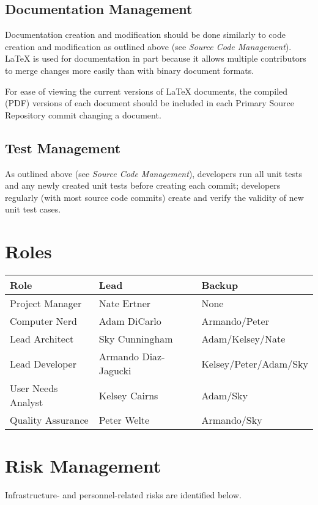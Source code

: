 \documentclass[11pt]{article}
\begin{document}
	\subsection{Documentation Management}
		Documentation creation and modification should be done similarly to code creation and modification as outlined above (see {\em Source Code Management}). LaTeX is used for documentation in part because it allows multiple contributors to merge changes more easily than with binary document formats.

		For ease of viewing the current versions of LaTeX documents, the compiled (PDF) versions of each document should be included in each Primary Source Repository commit changing a document.

	\subsection{Test Management}
		As outlined above (see {\em Source Code Management}), developers run all unit tests and any newly created unit tests before creating each commit; developers regularly (with most source code commits) create and verify the validity of new unit test cases.

\section{Roles}
\begin{tabular}{|l|l|l|}
\hline
\textbf{Role} & \textbf{Lead} & \textbf{Backup}  \\ \hline
Project Manager & Nate Ertner & None\\ \hline
Computer Nerd & Adam DiCarlo  & Armando/Peter\\ \hline
Lead Architect & Sky Cunningham  & Adam/Kelsey/Nate \\ \hline
Lead Developer & Armando Diaz-Jagucki & Kelsey/Peter/Adam/Sky \\ \hline
User Needs Analyst & Kelsey Cairns & Adam/Sky \\ \hline
Quality Assurance & Peter Welte  & Armando/Sky \\ \hline

\end{tabular}


\section{Risk Management}
Infrastructure- and personnel-related risks are identified below.
\end{document}
